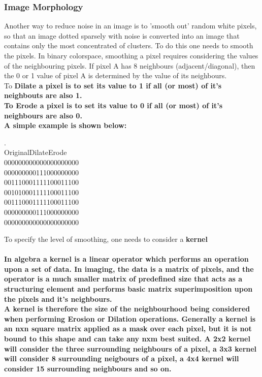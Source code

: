 \documentclass[11pt]{article} %
\newcommand{\tab}{\hspace*{2em}}
\begin{document}
\subsubsection{Image Morphology}
Another way to reduce noise in an image is to 'smooth out' random white pixels, so that an image dotted sparsely with noise is converted into an image that contains only the most concentrated of clusters.  To do this one needs to smooth the pixels.
In binary colorspace, smoothing a pixel requires considering the values of the neighbouring pixels. If pixel A has 8 neighbours (adjacent/diagonal), then the 0 or 1 value of pixel A is determined by the value of its neighbours.\\
To \bf{Dilate} a pixel is to set its value to 1 if all (or most) of it's neighbouts are also 1.\\
To \bf{Erode} a pixel is to set its value to 0 if all (or most) of it's neighbours are also 0.\\
A simple example is shown below:
\begin{center}
\begin{frame}
.\\
Original\tab	Dilate\tab	Erode\tab\\
\tiny{
0000000\tab	0000000\tab	0000000\\
0000000\tab	0011100\tab	0000000\\
0011100\tab	0111110\tab	0011100\\
0010100\tab	0111110\tab	0011100\\
0011100\tab	0111110\tab	0011100\\
0000000\tab	0011100\tab	0000000\\
0000000\tab	0000000\tab	0000000\\
}
\end{frame}
\end{center}

To specify the level of smoothing, one needs to consider a \bf{kernel}
\paragraph{In algebra a kernel is a linear operator which performs an operation upon a set of data. In imaging, the data is a matrix of pixels, and the operator is a much smaller matrix of predefined size that acts as a structuring element and performs basic matrix superimposition upon the pixels and it's neighbours. \\
A kernel is therefore the size of the neighbourhood being considered when performing Erosion or Dilation operations. Generally a kernel is an nxn square matrix applied as a mask over each pixel, but it is not bound to this shape and can take any nxm best suited.
A 2x2 kernel will consider the three surrounding neighbours of a pixel, a 3x3 kernel will consider 8 surrounding neigbours of a pixel, a 4x4 kernel will consider 15 surrounding neighbours and so on.
}
\end{document}
